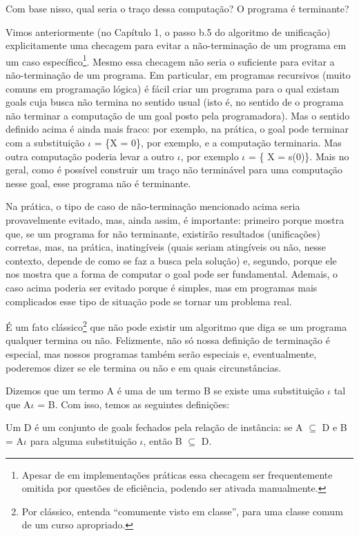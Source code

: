 \documentclass{article}
\begin{document}
Com base nisso, qual seria o traço dessa computação?  O programa é
terminante?

Vimos anteriormente (no Capítulo 1, o passo b.5 do algoritmo de
unificação) %
explicitamente uma checagem para evitar a não-terminação de um
programa em um caso específico\footnote{Apesar de em implementações
  práticas essa checagem ser frequentemente omitida por questões de eficiência,
  podendo ser ativada manualmente.}.  Mesmo essa checagem não seria o
suficiente para evitar a não-terminação de um programa.  Em
particular, em programas recursivos (muito comuns em programação
lógica) é fácil criar um programa para o qual existam goals cuja busca
não termina no sentido usual (isto é, no sentido de o programa não
terminar a computação de um goal posto pela programadora).  Mas o
sentido definido acima é ainda mais fraco: por exemplo, na prática, o
goal  pode terminar com a substituição $\iota$ =
\{X = 0\}, por exemplo, e a computação terminaria. Mas outra
computação poderia levar a outro $\iota$, por exemplo $\iota$ = \{ X =
s(0)\}. Mais no geral, como é possível construir um traço não
terminável para uma computação nesse goal, esse programa não é
terminante.

Na prática, o tipo de caso de não-terminação mencionado acima seria
provavelmente evitado, mas, ainda assim, é importante: primeiro porque
mostra que, se um programa for não terminante, existirão resultados
(unificações) corretas, mas, na prática, inatingíveis (quais seriam
atingíveis ou não, nesse contexto, depende de como se faz a busca pela
solução) e, segundo, porque ele nos mostra que a forma de computar o
goal pode ser fundamental. Ademais, o caso acima poderia ser evitado
porque é simples, mas em programas mais complicados esse tipo de
situação pode se tornar um problema real.

É um fato clássico\footnote{Por clássico, entenda ``comumente visto em
  classe'', para uma classe comum de um curso apropriado.} que não
pode existir um algoritmo que diga se um programa qualquer termina ou
não. Felizmente, não só nossa definição de terminação é especial, mas
nossos programas também serão especiais e, eventualmente, poderemos
dizer se ele termina ou não e em quais circunstâncias.

Dizemos que um termo A é uma  de um termo B se
existe uma substituição $\iota$ tal que A$\iota$ = B. Com isso, temos
as seguintes definições:

\begin{definition}
  Um  D é um conjunto de goals fechados pela
  relação de instância: se A $\subseteq$ D e B = A$\iota$ para alguma
  substituição $\iota$, então B $\subseteq$ D.
  \end{definition}
\end{document}
